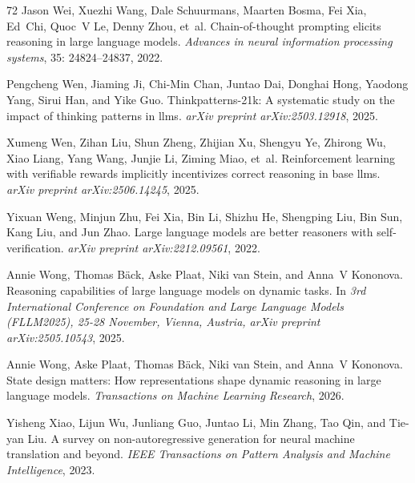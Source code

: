 \begin{thebibliography}{72}
Jason Wei, Xuezhi Wang, Dale Schuurmans, Maarten Bosma, Fei Xia, Ed~Chi, Quoc~V Le, Denny Zhou, et~al.
\newblock Chain-of-thought prompting elicits reasoning in large language models.
\newblock \emph{Advances in neural information processing systems}, 35: 24824--24837, 2022{}.

Pengcheng Wen, Jiaming Ji, Chi-Min Chan, Juntao Dai, Donghai Hong, Yaodong Yang, Sirui Han, and Yike Guo.
\newblock Thinkpatterns-21k: A systematic study on the impact of thinking patterns in llms.
\newblock \emph{arXiv preprint arXiv:2503.12918}, 2025{}.

Xumeng Wen, Zihan Liu, Shun Zheng, Zhijian Xu, Shengyu Ye, Zhirong Wu, Xiao Liang, Yang Wang, Junjie Li, Ziming Miao, et~al.
\newblock Reinforcement learning with verifiable rewards implicitly incentivizes correct reasoning in base llms.
\newblock \emph{arXiv preprint arXiv:2506.14245}, 2025{}.

Yixuan Weng, Minjun Zhu, Fei Xia, Bin Li, Shizhu He, Shengping Liu, Bin Sun, Kang Liu, and Jun Zhao.
\newblock Large language models are better reasoners with self-verification.
\newblock \emph{arXiv preprint arXiv:2212.09561}, 2022.

Annie Wong, Thomas B{\"a}ck, Aske Plaat, Niki van Stein, and Anna~V Kononova.
\newblock Reasoning capabilities of large language models on dynamic tasks.
\newblock In \emph{3rd International Conference on Foundation and Large Language Models (FLLM2025), 25-28 November, Vienna, Austria, arXiv preprint arXiv:2505.10543}, 2025.

Annie Wong, Aske Plaat, Thomas B{\"a}ck, Niki van Stein, and Anna~V Kononova.
\newblock State design matters: How representations shape dynamic reasoning in large language models.
\newblock \emph{Transactions on Machine Learning Research}, 2026.

Yisheng Xiao, Lijun Wu, Junliang Guo, Juntao Li, Min Zhang, Tao Qin, and Tie-yan Liu.
\newblock A survey on non-autoregressive generation for neural machine translation and beyond.
\newblock \emph{IEEE Transactions on Pattern Analysis and Machine Intelligence}, 2023.


\end{thebibliography}
